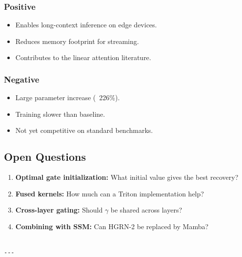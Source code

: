 \subsubsection{Positive}
\begin{itemize}
\item Enables long-context inference on edge devices.
\item Reduces memory footprint for streaming.
\item Contributes to the linear attention literature.

\end{itemize}
\subsubsection{Negative}
\begin{itemize}
\item Large parameter increase (~226\%).
\item Training slower than baseline.
\item Not yet competitive on standard benchmarks.

\end{itemize}
\subsection{Open Questions}

\begin{enumerate}
\item \textbf{Optimal gate initialization:} What initial value gives the best recovery?
\item \textbf{Fused kernels:} How much can a Triton implementation help?
\item \textbf{Cross-layer gating:} Should $\gamma$ be shared across layers?
\item \textbf{Combining with SSM:} Can HGRN-2 be replaced by Mamba?
\end{enumerate}
\begin{lstlisting}

---
\end{lstlisting}